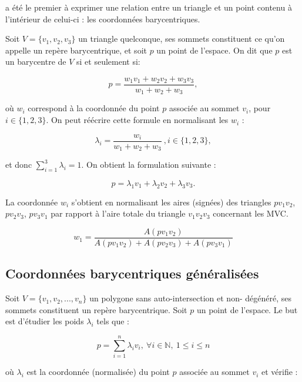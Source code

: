 \cite{Mob27} a été le premier à exprimer une relation entre un triangle et un
point contenu à l'intérieur de celui-ci : les
coordonnées barycentriques.

Soit $V = \{v_1, v_2, v_3\}$ un triangle quelconque, ses sommets constituent ce
qu'on appelle un repère barycentrique, et soit $p$ un point de l'espace. On dit
que $p$ est un barycentre de $V$ si et seulement si:

\begin{equation}
  p = \frac{w_1 v_1 + w_2 v_2 + w_3 v_3}{w_1+w_2+w_3},
\end{equation}

où $w_i$ correspond à la coordonnée du point $p$ associée au sommet $v_i$,
pour $i \in \{1, 2, 3\}$. On peut réécrire cette formule en normalisant les
$w_i$ :

\begin{equation}
  \lambda_i = \frac{w_i}{w_1+w_2+w_3} ~, i \in \{1, 2, 3\}, 
\end{equation}

et donc $\sum_{i=1}^3 \lambda_i = 1$. On obtient la formulation suivante :

\begin{equation}
  p = \lambda_1 v_1 + \lambda_2 v_2 + \lambda_3 v_3.
\end{equation}

La coordonnée $w_i$ s'obtient en normalisant les aires (signées) des triangles
$pv_1v_2$, $pv_2v_3$, $pv_3v_1$ par rapport à l'aire totale du triangle
$v_1v_2v_3$ concernant les MVC.

\begin{equation}
  w_1 = \frac{A(pv_1v_2)}{A(pv_1v_2)+A(pv_2v_3)+A(pv_3v_1)}
\end{equation}

\subsection{Coordonnées barycentriques généralisées}

Soit $V = \{v_1, v_2, ..., v_n\}$ un polygone sans auto-intersection et non-
dégénéré, ses sommets constituent un repère barycentrique. Soit $p$ un
point de l'espace. Le but est d'étudier les poids $\lambda_i$ tels que :

\begin{equation}
  p = \sum_{i=1}^{n} \lambda_i v_i ,
  ~ \forall i \in \mathbb{N} ,~ 1 \leq i \leq n
\end{equation}

où $\lambda_i$ est la coordonnée (normalisée) du point $p$ associée au sommet
$v_i$ et vérifie :

